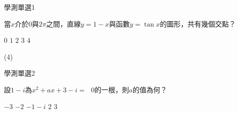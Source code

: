 \begin{QUESTIONS}
    \begin{QUESTION}
        \begin{ExamInfo}{87}{學測}{單選}{1}
        \end{ExamInfo}
        \begin{ExamAnsRateInfo}{}{}{}{}
        \end{ExamAnsRateInfo}
        \begin{QBODY}
            當$x$介於0與$2\pi $之間，直線$y=1-x$與函數$y=\tan x$的圖形，共有幾個交點？
            \begin{QOPS}
                \QOP $0$	
                \QOP $1$
                \QOP $2$	
                \QOP $3$
                \QOP $4$
            \end{QOPS}            
        \end{QBODY}
        \begin{QFROMS}
        \end{QFROMS}
        \begin{QTAGS}\end{QTAGS}
        \begin{QANS}
            (4)
        \end{QANS}
        \begin{QSOLLIST}
        \end{QSOLLIST}
        \begin{QEMPTYSPACE}
        \end{QEMPTYSPACE}
    \end{QUESTION}
    \begin{QUESTION}
        \begin{ExamInfo}{87}{學測}{單選}{2}
        \end{ExamInfo}
        \begin{ExamAnsRateInfo}{}{}{}{}
        \end{ExamAnsRateInfo}
        \begin{QBODY}
            設$1-i$為${{x}^{\text{2}}}+ax+3-i=\text{ }0$的一根，則$a$的值為何？
            \begin{QOPS}
                \QOP $-3$	
                \QOP $-2$
                \QOP $-1-i$	
                \QOP $2$
                \QOP $3$
            \end{QOPS}            
        \end{QBODY}
        \begin{QFROMS}
        \end{QFROMS}

\end{QUESTION}
\end{QUESTIONS}
